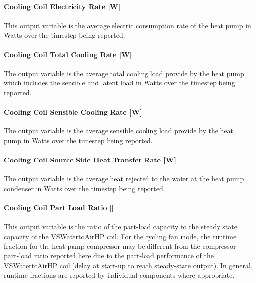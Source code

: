 \paragraph{Cooling Coil Electricity Rate {[}W{]}}\label{cooling-coil-electric-power-w-3}

This output variable is the average electric consumption rate of the heat pump in Watts over the timestep being reported.

\paragraph{Cooling Coil Total Cooling Rate {[}W{]}}\label{cooling-coil-total-cooling-rate-w-9}

The output variable is the average total cooling load provide by the heat pump which includes the sensible and latent load in Watts over the timestep being reported.

\paragraph{Cooling Coil Sensible Cooling Rate {[}W{]}}\label{cooling-coil-sensible-cooling-rate-w-9}

The output variable is the average sensible cooling load provide by the heat pump in Watts over the timestep being reported.

\paragraph{Cooling Coil Source Side Heat Transfer Rate {[}W{]}}\label{cooling-coil-source-side-heat-transfer-rate-w-2}

The output variable is the average heat rejected to the water at the heat pump condenser in Watts over the timestep being reported.

\paragraph{Cooling Coil Part Load Ratio {[]}}\label{cooling-coil-part-load-ratio-2}

This output variable is the ratio of the part-load capacity to the steady state capacity of the VSWatertoAirHP coil. For the cycling fan mode, the runtime fraction for the heat pump compressor may be different from the compressor part-load ratio reported here due to the part-load performance of the VSWatertoAirHP coil (delay at start-up to reach steady-state output). In general, runtime fractions are reported by individual components where appropriate.

